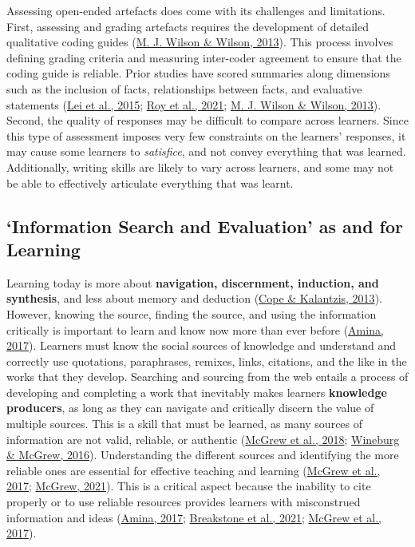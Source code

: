 \documentclass[a4paper, nobind]{templates/ociamthesis}
\begin{document}
Assessing open-ended artefacts does come with its challenges and
limitations. First, assessing and grading artefacts requires the
development of detailed qualitative coding guides
(\protect\hyperlink{ref-wilson2013comparison}{M. J. Wilson \& Wilson, 2013}). This process involves defining grading criteria
and measuring inter-coder agreement to ensure that the coding guide is
reliable. Prior studies have scored summaries along dimensions such as
the inclusion of facts, relationships between facts, and evaluative
statements (\protect\hyperlink{ref-lei2015effect}{Lei et al., 2015}; \protect\hyperlink{ref-roy2021note}{Roy et al., 2021}; \protect\hyperlink{ref-wilson2013comparison}{M. J. Wilson \& Wilson, 2013}).
Second, the quality of responses may be difficult to compare across
learners. Since this type of assessment imposes very few constraints on
the learners' responses, it may cause some learners to \emph{satisfice}, and
not convey everything that was learned. Additionally, writing skills are
likely to vary across learners, and some may not be able to effectively
articulate everything that was learnt.

\hypertarget{sec:bg_learn_info_eval}{%
\subsection{`Information Search and Evaluation' as and for Learning}\label{sec:bg_learn_info_eval}}

Learning today is more about \textbf{navigation, discernment, induction, and
synthesis}, and less about memory and deduction (\protect\hyperlink{ref-cope2013new}{Cope \& Kalantzis, 2013}).
However, knowing the source, finding the source, and using the
information critically is important to learn and know now more than ever
before (\protect\hyperlink{ref-amina2017active}{Amina, 2017}). Learners must know the social sources of
knowledge and understand and correctly use quotations, paraphrases,
remixes, links, citations, and the like in the works that they develop.
Searching and sourcing from the web entails a process of developing and
completing a work that inevitably makes learners \textbf{knowledge
producers}, as long as they can navigate and critically discern the
value of multiple sources. This is a skill that must be learned, as many
sources of information are not valid, reliable, or authentic
(\protect\hyperlink{ref-mcgrew2018can}{McGrew et al., 2018}; \protect\hyperlink{ref-wineburg2016students}{Wineburg \& McGrew, 2016}). Understanding the different
sources and identifying the more reliable ones are essential for
effective teaching and learning
(\protect\hyperlink{ref-mcgrew2017challenge}{McGrew et al., 2017}; \protect\hyperlink{ref-mcgrew2021skipping}{McGrew, 2021}). This is a critical aspect
because the inability to cite properly or to use reliable resources
provides learners with misconstrued information and ideas
(\protect\hyperlink{ref-amina2017active}{Amina, 2017}; \protect\hyperlink{ref-breakstone2021students}{Breakstone et al., 2021}; \protect\hyperlink{ref-mcgrew2017challenge}{McGrew et al., 2017}).
\end{document}
